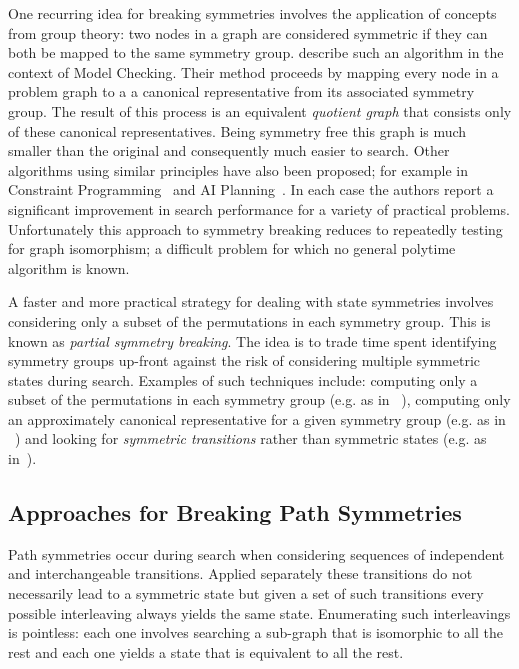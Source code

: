 One recurring idea for breaking symmetries involves the application of
concepts from group theory: two nodes in a graph are considered symmetric if
they can both be mapped to the same symmetry group. \cite{emerson96} describe
such an algorithm in the context of Model Checking. Their method proceeds by
mapping every node in a problem graph to a a canonical representative from its
associated symmetry group. The result of this process is an equivalent
\emph{quotient graph} that consists only of these canonical representatives.
Being symmetry free this graph is much smaller than the original and
consequently much easier to search. Other algorithms using similar principles
have also been proposed; for example in Constraint
Programming~\citep{crawford96,roney-dougal04} and AI
Planning~\citep{pochter11}.  In each case the authors report a significant
improvement in search performance for a variety of practical problems.
Unfortunately this approach to symmetry breaking reduces to repeatedly testing
for graph isomorphism; a difficult problem for which no general polytime
algorithm is known.

A faster and more practical strategy for dealing with state symmetries
involves considering only a subset of the permutations in each symmetry group.
This is known as \emph{partial symmetry breaking}. The idea is to trade time
spent identifying symmetry groups up-front against the risk of considering
multiple symmetric states during search.  Examples of such techniques include:
computing only a subset of the permutations in each symmetry group (e.g. as in
~\citep{crawford96}), computing only an approximately canonical representative
for a given symmetry group (e.g. as in ~\citep{pochter11}) and looking for
\emph{symmetric transitions} rather than symmetric states (e.g. as
in~\citep{fox99,fox02,rintannen03}).

\subsection{Approaches for Breaking Path Symmetries}
\label{cha::lit::symmetry::path}
Path symmetries occur during search when considering sequences of independent
and interchangeable transitions. Applied separately these transitions do not
necessarily lead to a symmetric state but given a set of such transitions
every possible interleaving always yields the same state.  Enumerating such
interleavings is pointless: each one involves searching a sub-graph that is
isomorphic to all the rest and each one yields a state that is equivalent to
all the rest.

